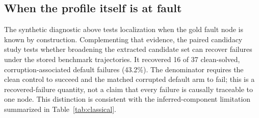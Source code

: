 \subsection{When the profile itself is at fault}
The synthetic diagnostic above tests localization when the gold fault node is known by construction. Complementing that evidence, the paired candidacy study tests whether broadening the extracted candidate set can recover failures under the stored benchmark trajectories. It recovered 16 of 37 clean-solved, corruption-associated default failures (43.2\%). The denominator requires the clean control to succeed and the matched corrupted default arm to fail; this is a recovered-failure quantity, not a claim that every failure is causally traceable to one node. This distinction is consistent with the inferred-component limitation summarized in Table~\ref{tab:classical}.
